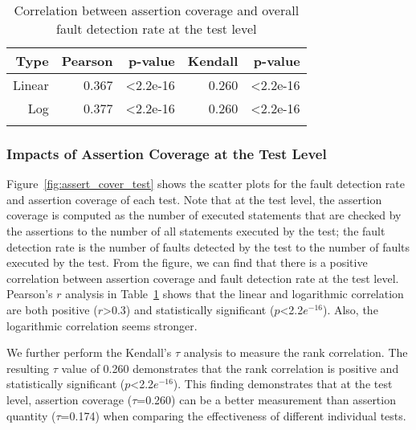 
\begin{table}[!t]
\renewcommand{\arraystretch}{1.3}
\tiny
\caption{Correlation between assertion coverage and overall fault detection rate at the test level}
\label{table:t_cor_ass_test}
\centering
\begin{tabular}
{rrrrr}
\Xhline{2\arrayrulewidth}
Type & Pearson & p-value & Kendall & p-value\\
\hline
Linear & 0.367 & \textless 2.2e-16 &0.260 & \textless 2.2e-16 \\
Log & 0.377 & \textless 2.2e-16    &0.260 & \textless 2.2e-16 \\
\Xhline{2\arrayrulewidth}
\end{tabular}
\end{table}

\subsubsection{Impacts of Assertion Coverage at the Test Level}


Figure~\ref{fig:assert_cover_test} shows the scatter plots for the
fault detection rate and assertion coverage of each test. Note that at
the test level, the assertion coverage is computed as the number of
executed statements that are checked by the assertions to the number
of all statements executed by the test; the fault detection rate is
the number of faults detected by the test to the number of faults
executed by the test. From the figure, we can find that there is a
positive correlation between assertion coverage and fault detection
rate at the test level. Pearson's $r$ analysis in
Table~\ref{table:t_cor_ass_test} shows that the linear and logarithmic
correlation are both positive ($r$>0.3) and statistically significant
($p$<2.2$e^{-16}$). Also, the logarithmic correlation seems stronger.

We further perform the Kendall's $\tau$ analysis to measure the rank
correlation. The resulting $\tau$ value of 0.260 demonstrates that the
rank correlation is positive and statistically significant
($p$<2.2$e^{-16}$). This finding demonstrates that at the test level,
assertion coverage ($\tau$=0.260) can be a better measurement than
assertion quantity ($\tau$=0.174) when comparing the effectiveness of
different individual tests.

